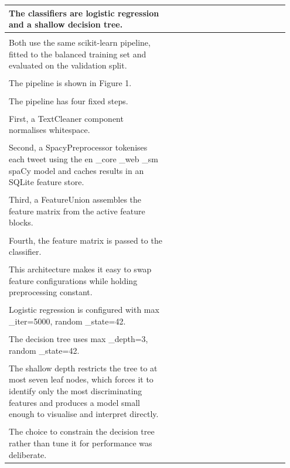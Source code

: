 \documentclass[11pt]{article}
\begin{document}
\begin{longtable}{|p{0.55\linewidth}|p{0.40\linewidth}|}
\hline
The classifiers are logistic regression and a shallow decision tree. & \\[2pt]
\hline
\rule{0pt}{3.5cm} & \\
\hline
Both use the same scikit-learn pipeline, fitted to the balanced training set and evaluated on the validation split. & \\[2pt]
\hline
\rule{0pt}{3.5cm} & \\
\hline
The pipeline is shown in Figure 1. & \\[2pt]
\hline
\rule{0pt}{3.5cm} & \\
\hline
The pipeline has four fixed steps. & \\[2pt]
\hline
\rule{0pt}{3.5cm} & \\
\hline
First, a TextCleaner component normalises whitespace. & \\[2pt]
\hline
\rule{0pt}{3.5cm} & \\
\hline
Second, a SpacyPreprocessor tokenises each tweet using the en \_core \_web \_sm spaCy model and caches results in an SQLite feature store. & \\[2pt]
\hline
\rule{0pt}{3.5cm} & \\
\hline
Third, a FeatureUnion assembles the feature matrix from the active feature blocks. & \\[2pt]
\hline
\rule{0pt}{3.5cm} & \\
\hline
Fourth, the feature matrix is passed to the classifier. & \\[2pt]
\hline
\rule{0pt}{3.5cm} & \\
\hline
This architecture makes it easy to swap feature configurations while holding preprocessing constant. & \\[2pt]
\hline
\rule{0pt}{3.5cm} & \\
\hline
Logistic regression is configured with max \_iter=5000, random \_state=42. & \\[2pt]
\hline
\rule{0pt}{3.5cm} & \\
\hline
The decision tree uses max \_depth=3, random \_state=42. & \\[2pt]
\hline
\rule{0pt}{3.5cm} & \\
\hline
The shallow depth restricts the tree to at most seven leaf nodes, which forces it to identify only the most discriminating features and produces a model small enough to visualise and interpret directly. & \\[2pt]
\hline
\rule{0pt}{3.5cm} & \\
\hline
The choice to constrain the decision tree rather than tune it for performance was deliberate. & \\[2pt]

\end{longtable}
\end{document}
